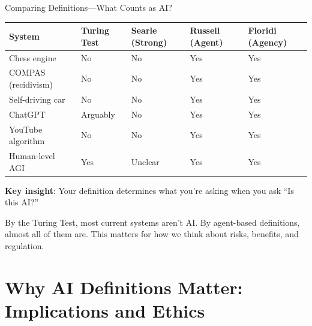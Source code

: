 ﻿\documentclass[aspectratio=169,11pt]{beamer}
\begin{document}
\begin{frame}{Comparing Definitions---What Counts as AI?}
\begin{table}[h]
\centering
\scriptsize
\begin{tabular}{@{}p{2.8cm}p{2cm}p{2cm}p{2.5cm}p{2.5cm}@{}}
\toprule
\textbf{System} & \textbf{Turing Test} & \textbf{Searle (Strong)} & \textbf{Russell (Agent)} & \textbf{Floridi (Agency)} \\
\midrule
Chess engine & No & No & Yes & Yes \\
COMPAS (recidivism) & No & No & Yes & Yes \\
Self-driving car & No & No & Yes & Yes \\
ChatGPT & Arguably & No & Yes & Yes \\
YouTube algorithm & No & No & Yes & Yes \\
Human-level AGI & Yes & Unclear & Yes & Yes \\
\bottomrule
\end{tabular}
\end{table}

\vspace{0.2em}
\textbf{Key insight}: Your definition determines what you're asking when you ask ``Is this AI?''

\vspace{0.2em}
By the Turing Test, most current systems aren't AI. By agent-based definitions, almost all of them are. This matters for how we think about risks, benefits, and regulation.
\end{frame}

\section{Why AI Definitions Matter: Implications and Ethics}
\end{document}

